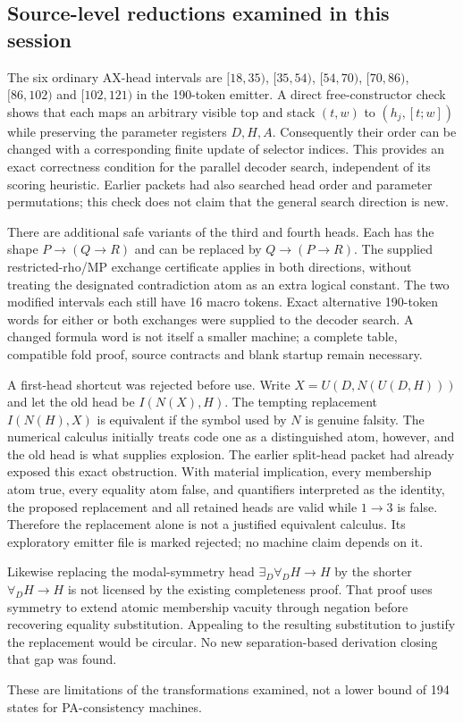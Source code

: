 \subsection{Source-level reductions examined in this session}

The six ordinary AX-head intervals are
$[18,35)$, $[35,54)$, $[54,70)$, $[70,86)$, $[86,102)$ and $[102,121)$
in the 190-token emitter. A direct free-constructor check shows that each
maps an arbitrary visible top and stack $(t,w)$ to $(h_j,[t;w])$ while
preserving the parameter registers $D,H,A$. Consequently their order can
be changed with a corresponding finite update of selector indices.
This provides an exact correctness condition for the parallel decoder
search, independent of its scoring heuristic. Earlier packets had also
searched head order and parameter permutations; this check does not claim
that the general search direction is new.

There are additional safe variants of the third and fourth heads. Each
has the shape $P\to(Q\to R)$ and can be replaced by $Q\to(P\to R)$.
The supplied restricted-rho/MP exchange certificate applies in both
directions, without treating the designated contradiction atom as an
extra logical constant. The two modified intervals each still have
16 macro tokens. Exact alternative 190-token words for either or both
exchanges were supplied to the decoder search. A changed formula word
is not itself a smaller machine; a complete table, compatible fold proof,
source contracts and blank startup remain necessary.

A first-head shortcut was rejected before use. Write
$X=U(D,N(U(D,H)))$ and let the old head be $I(N(X),H)$.
The tempting replacement $I(N(H),X)$ is equivalent if the symbol used
by $N$ is genuine falsity. The numerical calculus initially treats code
one as a distinguished atom, however, and the old head is what supplies
explosion. The earlier split-head packet had already exposed this exact
obstruction. With material implication, every membership atom true,
every equality atom false, and quantifiers interpreted as the identity,
the proposed replacement and all retained heads are valid while
$1\to3$ is false. Therefore the replacement alone is not a justified
equivalent calculus. Its exploratory emitter file is marked rejected;
no machine claim depends on it.

Likewise replacing the modal-symmetry head
$\exists_D\forall_D H\to H$ by the shorter
$\forall_D H\to H$ is not licensed by the existing completeness proof.
That proof uses symmetry to extend atomic membership vacuity through
negation before recovering equality substitution. Appealing to the
resulting substitution to justify the replacement would be circular.
No new separation-based derivation closing that gap was found.

These are limitations of the transformations examined, not a lower bound
of 194 states for PA-consistency machines.
